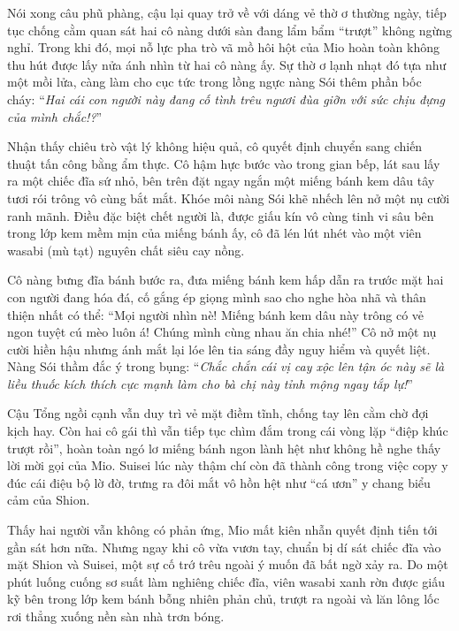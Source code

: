 \documentclass[../main.tex]{subfiles}
\begin{document}
Nói xong câu phũ phàng, cậu lại quay trở về với dáng vẻ thờ ơ thường ngày, tiếp tục chống cằm quan sát hai cô nàng dưới sàn đang lẩm bẩm ``trượt'' không ngừng nghỉ. Trong khi đó, mọi nỗ lực pha trò vã mồ hôi hột của Mio hoàn toàn không thu hút được lấy nửa ánh nhìn từ hai cô nàng ấy. Sự thờ ơ lạnh nhạt đó tựa như một mồi lửa, càng làm cho cục tức trong lồng ngực nàng Sói thêm phần bốc cháy: ``\textit{Hai cái con người này đang cố tình trêu ngươi đùa giỡn với sức chịu đựng của mình chắc!?}''

Nhận thấy chiêu trò vật lý không hiệu quả, cô quyết định chuyển sang chiến thuật tấn công bằng ẩm thực. Cô hậm hực bước vào trong gian bếp, lát sau lấy ra một chiếc đĩa sứ nhỏ, bên trên đặt ngay ngắn một miếng bánh kem dâu tây tươi rói trông vô cùng bắt mắt. Khóe môi nàng Sói khẽ nhếch lên nở một nụ cười ranh mãnh. Điều đặc biệt chết người là, được giấu kín vô cùng tinh vi sâu bên trong lớp kem mềm mịn của miếng bánh ấy, cô đã lén lút nhét vào một viên wasabi (mù tạt) nguyên chất siêu cay nồng.


Cô nàng bưng đĩa bánh bước ra, đưa miếng bánh kem hấp dẫn ra trước mặt hai con người đang hóa đá, cố gắng ép giọng mình sao cho nghe hòa nhã và thân thiện nhất có thể: ``Mọi người nhìn nè! Miếng bánh kem dâu này trông có vẻ ngon tuyệt cú mèo luôn á! Chúng mình cùng nhau ăn chia nhé!'' Cô nở một nụ cười hiền hậu nhưng ánh mắt lại lóe lên tia sáng đầy nguy hiểm và quyết liệt. Nàng Sói thầm đắc ý trong bụng: ``\textit{Chắc chắn cái vị cay xộc lên tận óc này sẽ là liều thuốc kích thích cực mạnh làm cho bà chị này tỉnh mộng ngay tắp lự!}''

Cậu Tổng ngồi cạnh vẫn duy trì vẻ mặt điềm tĩnh, chống tay lên cằm chờ đợi kịch hay. Còn hai cô gái thì vẫn tiếp tục chìm đắm trong cái vòng lặp ``điệp khúc trượt rồi'', hoàn toàn ngó lơ miếng bánh ngon lành hệt như không hề nghe thấy lời mời gọi của Mio. Suisei lúc này thậm chí còn đã thành công trong việc copy y đúc cái điệu bộ lờ đờ, trưng ra đôi mắt vô hồn hệt như ``cá ươn'' y chang biểu cảm của Shion.


Thấy hai người vẫn không có phản ứng, Mio mất kiên nhẫn quyết định tiến tới gần sát hơn nữa. Nhưng ngay khi cô vừa vươn tay, chuẩn bị dí sát chiếc đĩa vào mặt Shion và Suisei, một sự cố trớ trêu ngoài ý muốn đã bất ngờ xảy ra. Do một phút luống cuống sơ suất làm nghiêng chiếc đĩa, viên wasabi xanh rờn được giấu kỹ bên trong lớp kem bánh bỗng nhiên phản chủ, trượt ra ngoài và lăn lông lốc rơi thẳng xuống nền sàn nhà trơn bóng.
\end{document}
